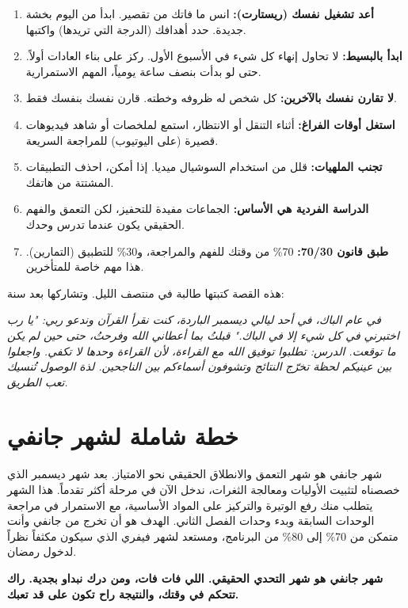\documentclass[12pt,a4paper]{book}
\newcommand{\quoteAr}[1]{%
	\begin{myquote}
		\itshape #1
	\end{myquote}
}
\newcommand{\importantAr}[1]{%
	\begin{important}
		\bfseries #1
	\end{important}
}
\begin{document}
\begin{enumerate}
	\item \textbf{أعد تشغيل نفسك (ريستارت):} انس ما فاتك من تقصير. ابدأ من اليوم بخشة جديدة. حدد أهدافك (الدرجة التي تريدها) واكتبها.
	\item \textbf{ابدأ بالبسيط:} لا تحاول إنهاء كل شيء في الأسبوع الأول. ركز على بناء العادات أولاً. حتى لو بدأت بنصف ساعة يومياً، المهم الاستمرارية.
	\item \textbf{لا تقارن نفسك بالآخرين:} كل شخص له ظروفه وخطته. قارن نفسك بنفسك فقط.
	\item \textbf{استغل أوقات الفراغ:} أثناء التنقل أو الانتظار، استمع لملخصات أو شاهد فيديوهات قصيرة (على اليوتيوب) للمراجعة السريعة.
	\item \textbf{تجنب الملهيات:} قلل من استخدام السوشيال ميديا. إذا أمكن، احذف التطبيقات المشتتة من هاتفك.
	\item \textbf{الدراسة الفردية هي الأساس:} الجماعات مفيدة للتحفيز، لكن التعمق والفهم الحقيقي يكون عندما تدرس وحدك.
	\item \textbf{طبق قانون 70/30:} 70\% من وقتك للفهم والمراجعة، و30\% للتطبيق (التمارين). هذا مهم خاصة للمتأخرين.
\end{enumerate}



هذه القصة كتبتها طالبة في منتصف الليل. وتشاركها بعد سنة:

\quoteAr{في عام الباك، في أحد ليالي ديسمبر الباردة، كنت نقرأ القرآن وندعو ربي: "يا رب اختبرني في كل شيء إلا في الباك." قبلتُ بما أعطاني الله وفرحتُ، حتى حين لم يكن ما توقعت. الدرس: تطلبوا توفيق الله مع القراءة، لأن القراءة وحدها لا تكفي. واجعلوا بين عينيكم لحظة تخرّج النتائج وتشوفون أسماءكم بين الناجحين. لذة الوصول تُنسيك تعب الطريق.}

	
	\section{خطة شاملة لشهر جانفي }
	
	شهر جانفي هو شهر التعمق والانطلاق الحقيقي نحو الامتياز. بعد شهر ديسمبر الذي خصصناه لتثبيت الأوليات ومعالجة الثغرات، ندخل الآن في مرحلة أكثر تقدماً. هذا الشهر يتطلب منك رفع الوتيرة والتركيز على المواد الأساسية، مع الاستمرار في مراجعة الوحدات السابقة وبدء وحدات الفصل الثاني. الهدف هو أن تخرج من جانفي وأنت متمكن من 70\% إلى 80\% من البرنامج، ومستعد لشهر فيفري الذي سيكون مكثفاً نظراً لدخول رمضان.
	
	\importantAr{شهر جانفي هو شهر التحدي الحقيقي. اللي فات فات، ومن درك نبداو بجدية. راك تتحكم في وقتك، والنتيجة راح تكون على قد تعبك.}
	
\end{document}
